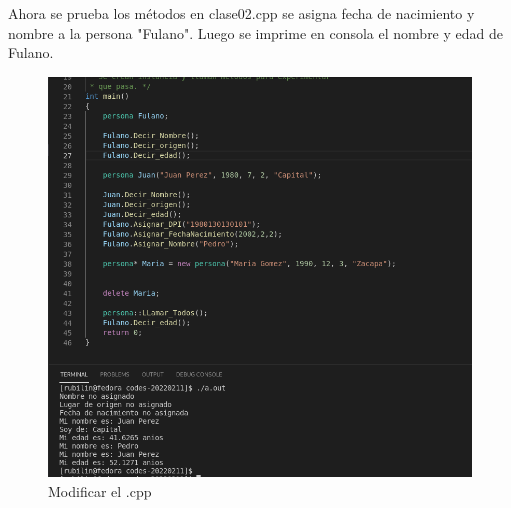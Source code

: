 \documentclass[11pt]{article}
\begin{document}
	
	Ahora se prueba los métodos en clase02.cpp se asigna fecha de nacimiento y nombre a la persona "Fulano". Luego se imprime en consola el nombre y edad de Fulano.
	
	


\begin{figure}[H]
\centering
\includegraphics[width=0.7\linewidth]{img4	}
\caption{Modificar el .cpp}
\label{fig:img4}
\end{figure}


	
	
	
	\vspace{0.1 in}
	
\end{document}
